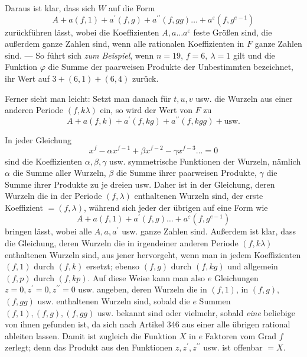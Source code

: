 Daraus ist klar, dass sich \(W\) auf die Form
\[A+a(f,1)+a^{\prime}(f,g)+a^{\prime\prime}(f,gg)\ldots+a^\varepsilon(f,g^{e-1})\] zurückführen lässt, wobei die Koeffizienten \(A,\allowbreak a\ldots a^\varepsilon\) feste Größen sind, die außerdem ganze Zahlen sind, wenn alle rationalen Koeffizienten in \(F\) ganze Zahlen sind. — So führt sich \textit{zum Beispiel}, wenn \(n=19\), \(f=6,\allowbreak \ \lambda=1\) gilt und die Funktion \(\varphi\) die Summe der paarweisen Produkte der Unbestimmten bezeichnet, ihr Wert auf \(3+(6,1)+(6,4)\) zurück.

Ferner sieht man leicht: Setzt man danach für \(t,\allowbreak u,\allowbreak v\) usw. die Wurzeln aus einer anderen Periode \((f,k\lambda)\) ein, so wird der Wert von \(F\) zu \[A+a(f,k)+a^{\prime}(f,kg)+a^{\prime\prime}(f,kgg)+\text{usw.}\]

In jeder Gleichung \[x^f-\alpha x^{f-1}+\beta x^{f-2}-\gamma x^{f-3}\ldots=0\] sind die Koeffizienten \(\alpha,\allowbreak \beta,\allowbreak \gamma\) usw. symmetrische Funktionen der Wurzeln, nämlich \(\alpha\) die Summe aller Wurzeln, \(\beta\) die Summe ihrer paarweisen Produkte, \(\gamma\) die Summe ihrer Produkte zu je dreien usw. Daher ist in der Gleichung, deren Wurzeln die in der Periode \((f,\lambda)\) enthaltenen Wurzeln sind, der erste Koeffizient \(=(f,\lambda)\), während sich jeder der übrigen auf eine Form wie \[A+a(f,1)+a^{\prime}(f,g)\ldots+a^\varepsilon(f,g^{e-1})\] bringen lässt, wobei alle \(A,\allowbreak a,\allowbreak a^{\prime}\) usw. ganze Zahlen sind. Außerdem ist klar, dass die Gleichung, deren Wurzeln die in irgendeiner anderen Periode \((f,k\lambda)\) enthaltenen Wurzeln sind, aus jener hervorgeht, wenn man in jedem Koeffizienten \((f,1)\) durch \((f,k)\) ersetzt; ebenso \((f,g)\) durch \((f,kg)\) und allgemein \((f,p)\) durch \((f,kp)\). Auf diese Weise kann man also \(e\) Gleichungen \(z=0,\allowbreak z^{\prime}=0,\allowbreak z^{\prime\prime}=0\) usw. angeben, deren Wurzeln die in \((f,1)\), in \((f,g)\), \((f,gg)\) usw. enthaltenen Wurzeln sind, sobald die \(e\) Summen \((f,1),\allowbreak (f,g),\allowbreak (f,gg)\) usw. bekannt sind oder vielmehr, sobald \textit{eine} beliebige von ihnen gefunden ist, da sich nach Artikel 346 aus einer alle übrigen rational ableiten lassen. Damit ist zugleich die Funktion \(X\) in \(e\) Faktoren vom Grad \(f\) zerlegt; denn das Produkt aus den Funktionen \(z,\allowbreak z^{\prime},\allowbreak z^{\prime\prime}\) usw. ist offenbar \(=X\).

